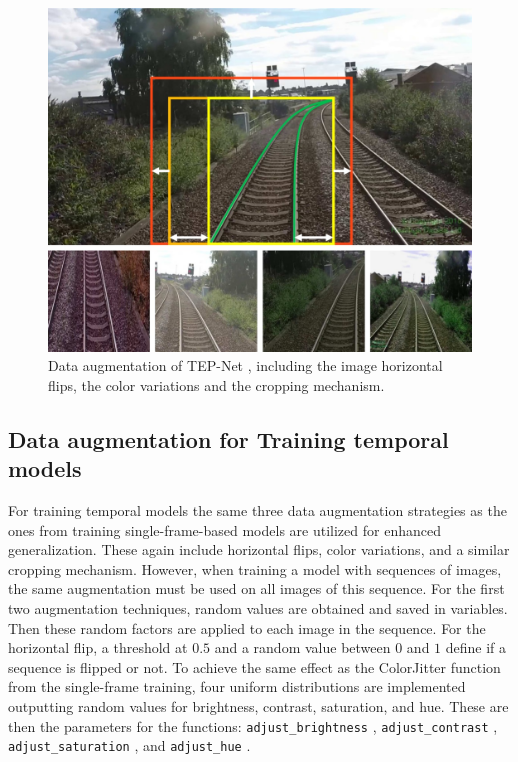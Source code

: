 \begin{figure}[H]
    \centering
    \includegraphics[width=0.6\linewidth]{PICs/Baselinepaper/data_augmenation.jpg}
    \caption{Data augmentation of \ac{TEP}-Net \cite{tepNet2024}, including the image horizontal flips, the color variations and the cropping mechanism.}
    \label{fig:tepNet_dataaugmentation}
\end{figure}

\subsection{Data augmentation for Training temporal models}

For training temporal models the same three data augmentation strategies as the ones from training single-frame-based models are utilized for enhanced generalization.
These again include horizontal flips, color variations, and a similar cropping mechanism.
However, when training a model with sequences of images, the same augmentation must be used on all images of this sequence.
For the first two augmentation techniques, random values are obtained and saved in variables.
Then these random factors are applied to each image in the sequence.
For the horizontal flip, a threshold at $0.5$ and a random value between $0$ and $1$ define if a sequence is flipped or not.
To achieve the same effect as the ColorJitter \cite{pytorch_colorJitter_docu} function from the single-frame training, four uniform distributions are implemented outputting random values for brightness, contrast, saturation, and hue.
These are then the parameters for the functions: \texttt{adjust\_brightness} \cite{pytorch_adjust_brightness_docu}, \texttt{adjust\_contrast} \cite{pytorch_adjust_contrast_docu}, \texttt{adjust\_saturation} \cite{pytorch_adjust_saturation_docu}, and \texttt{adjust\_hue} \cite{pytorch_adjust_hue_docu}.

